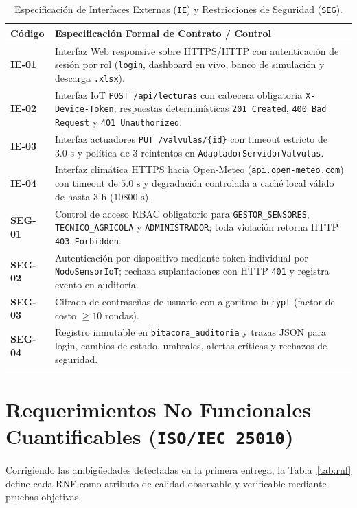 \documentclass[11pt,letterpaper]{report}
\begin{document}
\begin{table}[H]
\centering
\caption{Especificación de Interfaces Externas (\texttt{IE}) y Restricciones de Seguridad (\texttt{SEG}).}
\label{tab:ie_seg}
\small
\begin{tabularx}{\textwidth}{l Y}
\toprule
\textbf{Código} & \textbf{Especificación Formal de Contrato / Control} \\
\midrule
\textbf{IE-01} & Interfaz Web responsive sobre HTTPS/HTTP con autenticación de sesión por rol (\texttt{login}, dashboard en vivo, banco de simulación y descarga \texttt{.xlsx}). \\
\textbf{IE-02} & Interfaz IoT \texttt{POST /api/lecturas} con cabecera obligatoria \texttt{X-Device-Token}; respuestas determinísticas \texttt{201 Created}, \texttt{400 Bad Request} y \texttt{401 Unauthorized}. \\
\textbf{IE-03} & Interfaz actuadores \texttt{PUT /valvulas/\{id\}} con timeout estricto de $3.0\text{ s}$ y política de $3$ reintentos en \texttt{AdaptadorServidorValvulas}. \\
\textbf{IE-04} & Interfaz climática HTTPS hacia Open-Meteo (\texttt{api.open-meteo.com}) con timeout de $5.0\text{ s}$ y degradación controlada a caché local válido de hasta $3\text{ h}$ ($10800\text{ s}$). \\
\textbf{SEG-01} & Control de acceso RBAC obligatorio para \texttt{GESTOR\_SENSORES}, \texttt{TECNICO\_AGRICOLA} y \texttt{ADMINISTRADOR}; toda violación retorna HTTP \texttt{403 Forbidden}. \\
\textbf{SEG-02} & Autenticación por dispositivo mediante token individual por \texttt{NodoSensorIoT}; rechaza suplantaciones con HTTP \texttt{401} y registra evento en auditoría. \\
\textbf{SEG-03} & Cifrado de contraseñas de usuario con algoritmo \texttt{bcrypt} (factor de costo $\ge 10$ rondas). \\
\textbf{SEG-04} & Registro inmutable en \texttt{bitacora\_auditoria} y trazas JSON para login, cambios de estado, umbrales, alertas críticas y rechazos de seguridad. \\
\bottomrule
\end{tabularx}
\end{table}

\section{Requerimientos No Funcionales Cuantificables (\texttt{ISO/IEC 25010})}
Corrigiendo las ambigüedades detectadas en la primera entrega, la Tabla~\ref{tab:rnf} define cada RNF como atributo de calidad observable y verificable mediante pruebas objetivas.
\end{document}
